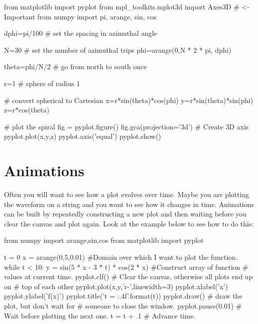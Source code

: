 \begin{codeexample}
\begin{VerbatimOut}{\listingFile}
from matplotlib import pyplot
from mpl_toolkits.mplot3d import Axes3D  # <- Important
from numpy import pi, arange, sin, cos

dphi=pi/100 # set the spacing in azimuthal angle

N=30 # set the number of azimuthal trips
phi=arange(0,N * 2 * pi, dphi)

theta=phi/N/2 # go from north to south once

r=1  # sphere of radius 1

# convert spherical to Cartesian
x=r*sin(theta)*cos(phi)
y=r*sin(theta)*sin(phi)
z=r*cos(theta)

# plot the spiral
fig = pyplot.figure()
fig.gca(projection='3d')  # Create 3D axis
pyplot.plot(x,y,z)
pyplot.axis('equal')
pyplot.show()
\end{VerbatimOut}
\end{codeexample}


\section{Animations}
Often you will want to see how a plot evolves over time.  Maybe you
are plotting the waveform on a string and you want to see how it
changes in time.  Animations can be built by repeatedly constructing a
new plot and then waiting before you clear the canvas and plot again.
Look at the example below to see how to do this:


\begin{codeexample}
\begin{VerbatimOut}{\listingFile}
from numpy import arange,sin,cos
from matplotlib import pyplot

t = 0
x = arange(0,5,0.01)   #Domain over which I want to plot the function.
 while t < 10:
    y = sin(5 * x - 3 * t) * cos(2 * x)  #Construct array of function
                                         # values at current time.
    pyplot.clf()  # Clear the canvas, otherwise all plots end up on
                  # top of each other
    pyplot.plot(x,y,'r-',linewidth=3)
    pyplot.xlabel('x')
    pyplot.ylabel('f(x)')
    pyplot.title('t = {:.4f}'.format(t))
    pyplot.draw()           # draw the plot, but don't wait for
                            # someone to close the window.
    pyplot.pause(0.01)      # Wait before plotting the next one.
    t = t + .1              # Advance time.
\end{VerbatimOut}
\end{codeexample}

